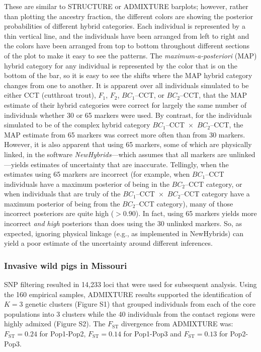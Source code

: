 {\begin{figure}
\label{fig:newhyb-sims-barplot}
\end{figure}
These are similar to STRUCTURE or ADMIXTURE barplots;
however, rather than plotting the ancestry fraction, the different colors are showing the
posterior probabilities of different hybrid categories.  Each individual is represented by a thin
vertical line, and the individuals have been arranged from left to right and the colors have been
arranged from top to bottom throughout different sections of the plot to make it easy to see
the patterns.  The {\em maximum-a-posteriori} (MAP) hybrid category for any individual is represented
by the color that is on the bottom of the bar, so it is easy to see the shifts where the MAP hybrid
category changes from one to another.  It is apparent over all individuals simulated to be
either CCT (cutthroat trout), $F_1$, $F_2$, $BC_1$--CCT, or $BC_2$--CCT, that the MAP estimate of their
hybrid categories were correct for largely the same number of individuals whether 30 or 65 markers
were used. By contrast, for the individuals simulated to be of the complex hybrid category
$BC_1$--CCT~$\times$~$BC_2$--CCT, the MAP estimate from 65 markers was correct more often 
than from 
30 markers.  However, it is also apparent that using 65 markers, some of which are physically
linked, in the software {\em NewHybrids}---which assumes that all markers are unlinked---yields 
estimates of uncertainty that are inaccurate.  Tellingly, when the estimates using 65 markers are 
incorrect (for example, when $BC_1$--CCT individuals have a maximum posterior of being in the 
$BC_2$--CCT category,
or when individuals that are truly of the $BC_1$--CCT~$\times$~$BC_2$--CCT category have a
maximum posterior of being from the $BC_2$--CCT category), many of those incorrect posteriors
are quite high ($>0.90$).  In fact, using 65 markers yields more incorrect {\em and high} posteriors 
than does using the 30 unlinked markers. So, as expected, ignoring physical linkage (e.g., as 
implemented in {\sc NewHybrids}) 
can yield a poor estimate of the uncertainty around different inferences.

\subsubsection*{Invasive wild pigs in Missouri}

SNP filtering resulted in 14,233 loci that were used for subsequent analysis.
Using the 160 empirical samples, ADMIXTURE results supported the identification of
$K=3$ genetic clusters (Figure S1) that grouped individuals from each of the core populations into 3 clusters
while the 40 individuals from the contact regions were highly admixed (Figure S2). The
$F_\mathrm{ST}$ divergence from ADMIXTURE was:
$F_\mathrm{ST} = 0.24$ for Pop1-Pop2,
$F_\mathrm{ST} = 0.14$ for Pop1-Pop3 and
$F_\mathrm{ST} = 0.13$ for Pop2-Pop3.

}

